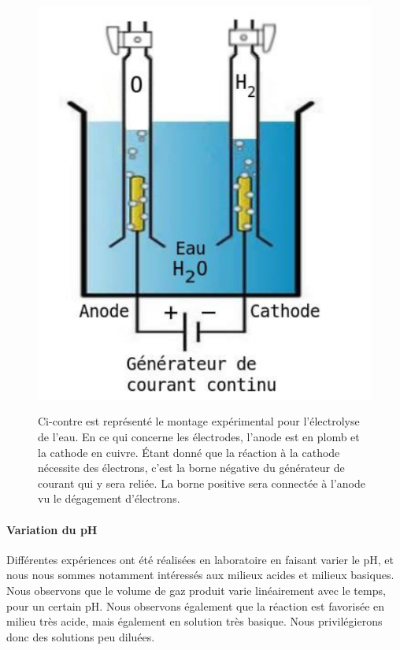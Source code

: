 \begin{figure}[h!]
   \begin{minipage}[c]{.3\linewidth}
      \includegraphics[scale=0.45]{laboelectrolyse.png}
   \end{minipage} \hfill
   \begin{minipage}[c]{.46\linewidth}
      Ci-contre est représenté le montage expérimental pour l'électrolyse de l'eau. En ce qui concerne les 
      électrodes, l'anode est en plomb et la cathode en cuivre. Étant donné que la réaction à la cathode
      nécessite des électrons, c'est la borne négative du générateur de courant qui y sera reliée. La borne 
      positive sera connectée à l'anode vu le dégagement d'électrons.
   \end{minipage}
\end{figure}

\paragraph{Variation du pH}  Différentes expériences ont été réalisées en laboratoire en faisant varier le pH, et
nous nous sommes notamment intéressés aux milieux acides et milieux basiques. Nous observons que le volume de gaz
produit varie linéairement avec le temps, pour un certain pH. Nous observons également que la réaction est favorisée
en milieu très acide, mais également en solution très basique. Nous privilégierons donc des solutions peu diluées.

